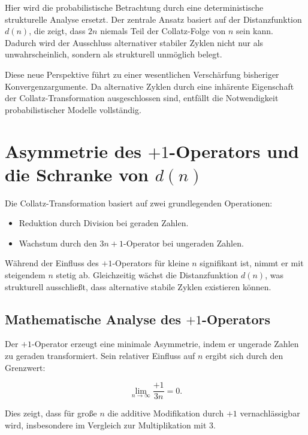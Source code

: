 \documentclass[a4paper,12pt]{article}
\begin{document}
Hier wird die probabilistische Betrachtung durch eine deterministische strukturelle Analyse ersetzt. Der zentrale Ansatz basiert auf der Distanzfunktion \( d(n) \), die zeigt, dass \( 2n \) niemals Teil der Collatz-Folge von \( n \) sein kann. Dadurch wird der Ausschluss alternativer stabiler Zyklen nicht nur als unwahrscheinlich, sondern als strukturell unmöglich belegt.

Diese neue Perspektive führt zu einer wesentlichen Verschärfung bisheriger Konvergenzargumente. Da alternative Zyklen durch eine inhärente Eigenschaft der Collatz-Transformation ausgeschlossen sind, entfällt die Notwendigkeit probabilistischer Modelle vollständig.







\section{Asymmetrie des \( +1 \)-Operators und die Schranke von \( d(n) \)}

Die Collatz-Transformation basiert auf zwei grundlegenden Operationen:

\begin{itemize}
    \item Reduktion durch Division bei geraden Zahlen.
    \item Wachstum durch den \( 3n+1 \)-Operator bei ungeraden Zahlen.
\end{itemize}

Während der Einfluss des \( +1 \)-Operators für kleine \( n \) signifikant ist, nimmt er mit steigendem \( n \) stetig ab. Gleichzeitig wächst die Distanzfunktion \( d(n) \), was strukturell ausschließt, dass alternative stabile Zyklen existieren können.

\subsection{Mathematische Analyse des \( +1 \)-Operators}

Der \( +1 \)-Operator erzeugt eine minimale Asymmetrie, indem er ungerade Zahlen zu geraden transformiert. Sein relativer Einfluss auf \( n \) ergibt sich durch den Grenzwert:

\begin{equation} 
    \lim_{n \to \infty} \frac{+1}{3n} = 0.
\end{equation}

Dies zeigt, dass für große \( n \) die additive Modifikation durch \( +1 \) vernachlässigbar wird, insbesondere im Vergleich zur Multiplikation mit 3.
\end{document}
